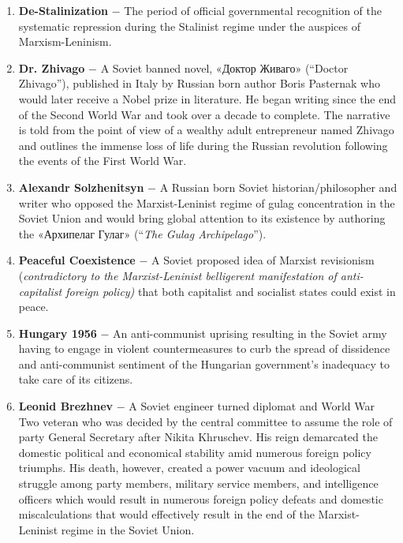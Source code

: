 \documentclass[12pt]{article}
\begin{document}
\begin{flushleft}
\begin{enumerate}
    \item \textbf{De-Stalinization} $-$ The period of official governmental recognition of the systematic repression during the Stalinist regime under the auspices of Marxism-Leninism.

    \item \textbf{Dr. Zhivago} $-$ A Soviet banned novel, «Доктор Живаго» (``Doctor Zhivago''), published in Italy by Russian born author Boris Pasternak who would later receive a Nobel prize in literature. He began writing since the end of the Second World War and took over a decade to complete. The narrative is told from the point of view of a wealthy adult entrepreneur named Zhivago and outlines the immense loss of life during the Russian revolution following the events of the First World War.

    \item \textbf{Alexandr Solzhenitsyn} $-$ A Russian born Soviet historian/philosopher and writer who opposed the Marxist-Leninist regime of gulag concentration in the Soviet Union and would bring global attention to its existence by authoring the «Архипелаг Гулаг» (``\emph{The Gulag Archipelago}'').

    \item \textbf{Peaceful Coexistence} $-$ A Soviet proposed idea of Marxist revisionism (\emph{contradictory to the Marxist-Leninist belligerent manifestation of anti-capitalist foreign policy)} that both capitalist and socialist states could exist in peace.

    \item \textbf{Hungary 1956} $-$ An anti-communist uprising resulting in the Soviet army having to engage in violent countermeasures to curb the spread of dissidence and anti-communist sentiment of the Hungarian government's inadequacy to take care of its citizens. 

    \item \textbf{Leonid Brezhnev} $-$ A Soviet engineer turned diplomat and World War Two veteran who was decided by the central committee to assume the role of party General Secretary after Nikita Khruschev. His reign demarcated the domestic political and economical stability amid numerous foreign policy triumphs. His death, however, created a power vacuum and ideological struggle among party members, military service members, and intelligence officers which would result in numerous foreign policy defeats and domestic miscalculations that would effectively result in the end of the Marxist-Leninist regime in the Soviet Union.


\end{enumerate}
\end{flushleft}
\end{document}
